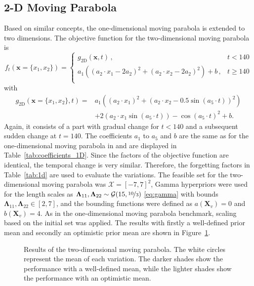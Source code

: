 \newpage
\subsection{2-D Moving Parabola}
\label{sec:2D}

Based on similar concepts, the one-dimensional moving parabola is extended to two dimensions. The objective function for the two-dimensional moving parabola is
\begin{equation}
    f_t(\mathbf{x}=\{x_1,x_2\}) = \begin{cases}
        g_{\text{2D}}(\mathbf{x},t) \, ,& t < 140\\
        a_1 \left( (a_2 \cdot x_1 - 2a_2)^2 + (a_2 \cdot x_2 - 2a_2)^2 \right) +b \, ,&t \ge 140 \\
        \end{cases}
\end{equation}
with
\begin{align}
    g_{\text{2D}}(\mathbf{x}=\{x_1,x_2\},t) =& a_1 \left( (a_2 \cdot x_1)^2 + (a_2 \cdot x_2 - 0.5\sin(a_5\cdot t))^2 \right) \nonumber \\
    &+ 2(a_2 \cdot x_1 \sin(a_5\cdot t)) - \cos(a_5\cdot t)^2 +b.
\end{align}
Again, it consists of a part with gradual change for $t<140$ and a subsequent sudden change at $t=140$. The coefficients $a_1$ to $a_5$ and $b$ are the same as for the one-dimensional moving parabola in  and are displayed in Table~\ref{tab:coefficients_1D}. Since the factors of the objective function are identical, the temporal change is very similar. Therefore, the forgetting factors in Table~\ref{tab:1d} are used to evaluate the variations. The feasible set for the two-dimensional moving parabola was $\mathcal{X}=[-7, 7]^2$, Gamma hyperpriors were used for the length scales as $\boldsymbol\Lambda_{11}, \boldsymbol\Lambda_{22} \sim \mathcal{G}(15, \nicefrac{10}{3})$ \eqref{eq:gamma} with bounds $\boldsymbol\Lambda_{11},\boldsymbol\Lambda_{22} \in [2, 7]$, and the bounding functions were defined as $a(\mathbf{X}_v)=0$ and $b(\mathbf{X}_v)=4$. As in the one-dimensional moving parabola benchmark, scaling based on the initial set was applied. The results with firstly a well-defined prior mean and secondly an optimistic prior mean are shown in Figure~\ref{fig:Parabola2D_cumulative_regret}.
\begin{figure}[h]
    \centering
    
    \caption[Results of the two-dimensional moving parabola.]{Results of the two-dimensional moving parabola. The white circles represent the mean of each variation. The darker shades show the performance with a well-defined mean, while the lighter shades show the performance with an optimistic mean.}
    \label{fig:Parabola2D_cumulative_regret}
\end{figure}

